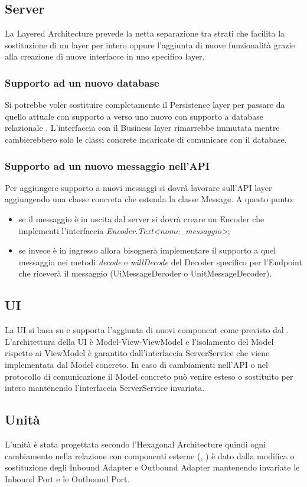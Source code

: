 \subsection{Server}
	La Layered Architecture prevede la netta separazione tra strati che facilita la sostituzione di un layer per intero oppure l'aggiunta di nuove funzionalità grazie alla creazione di nuove interfacce in uno specifico layer.
	\subsubsection{Supporto ad un nuovo database}
	Si potrebbe voler sostituire completamente il Persistence layer per passare da quello attuale con supporto a  verso uno nuovo con supporto a database relazionale . L'interfaccia con il Business layer rimarrebbe immutata mentre cambierebbero solo le classi concrete incaricate di comunicare con il database.
	\subsubsection{Supporto ad un nuovo messaggio nell'API}
	Per aggiungere supporto a nuovi messaggi si dovrà lavorare sull'API layer aggiungendo una classe concreta che estenda la classe Message. A questo punto:
	\begin{itemize}
		\item se il messaggio è in uscita dal server si dovrà creare un Encoder che implementi l'interfaccia \textit{Encoder.Text<nome\_messaggio>};
		\item se invece è in ingresso allora bisognerà implementare il supporto a quel messaggio nei metodi \textit{decode} e \textit{willDecode} del Decoder specifico per l'Endpoint che riceverà il messaggio (UiMessageDecoder o UnitMessageDecoder).
	\end{itemize}

\subsection{UI}
	La UI si basa su  e supporta l'aggiunta di nuovi component come previsto dal . L'architettura della UI è Model-View-ViewModel e l'isolamento del Model rispetto ai ViewModel è garantito dall'interfaccia ServerService che viene implementata dal Model concreto. In caso di cambiamenti nell'API o nel protocollo di comunicazione il Model concreto può venire esteso o sostituito per intero mantenendo l'interfaccia ServerService invariata.
	
\subsection{Unità}
	L'unità è stata progettata secondo l'Hexagonal Architecture quindi ogni cambiamento nella relazione con componenti esterne (, ) è dato dalla modifica o sostituzione degli Inbound Adapter e Outbound Adapter mantenendo invariate le Inbound Port e le Outbound Port.